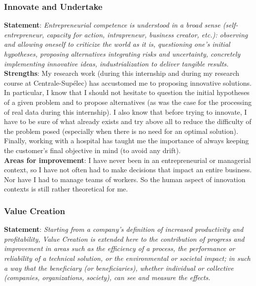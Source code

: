 \documentclass[preprint,12pt]{elsarticle}
\begin{document}
\subsubsection{Innovate and Undertake}

\noindent \textbf{Statement}: \textit{Entrepreneurial competence is understood in a broad sense (self-entrepreneur, capacity for action, intrapreneur, business creator, etc.): observing and allowing oneself to criticize the world as it is, questioning one's initial hypotheses, proposing alternatives integrating risks and uncertainty, concretely implementing innovative ideas, industrialization to deliver tangible results.}\\[3 pt]

\noindent \textbf{Strengths}: My research work (during this internship and during my research course at Centrale-Supélec) has accustomed me to proposing innovative solutions. In particular, I know that I should not hesitate to question the initial hypotheses of a given problem and to propose alternatives (as was the case for the processing of real data during this internship). I also know that before trying to innovate, I have to be sure of what already exists and try above all to reduce the difficulty of the problem posed (especially when there is no need for an optimal solution). Finally, working with a hospital has taught me the importance of always keeping the customer's final objective in mind (to avoid any drift).\\[3 pt]

\noindent \textbf{Areas for improvement}: I have never been in an entrepreneurial or managerial context, so I have not often had to make decisions that impact an entire business. Nor have I had to manage teams of workers. So the human aspect of innovation contexts is still rather theoretical for me.

\subsubsection{Value Creation}

\noindent \textbf{Statement}: \textit{Starting from a company's definition of increased productivity and profitability, Value Creation is extended here to the contribution of progress and improvement in areas such as the efficiency of a process, the performance or reliability of a technical solution, or the environmental or societal impact; in such a way that the beneficiary (or beneficiaries), whether individual or collective (companies, organizations, society), can see and measure the effects.}\\[3 pt]
\end{document}
